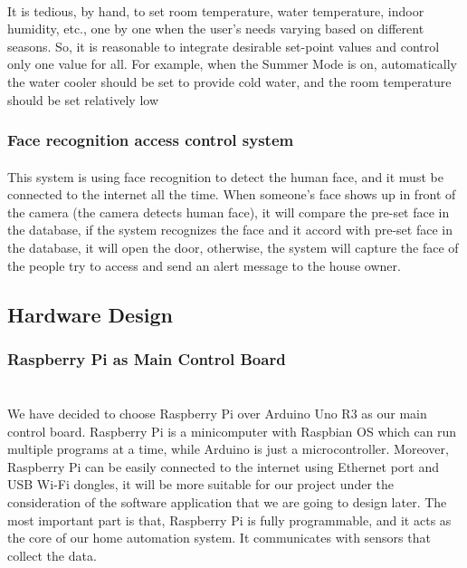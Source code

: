 \documentclass[a4paper,12pt]{article}
\begin{document}
\paragraph{}
It is tedious, by hand, to set room temperature, water temperature, indoor humidity, etc., one by one when the user's needs varying based on different seasons. So, it is reasonable to integrate desirable set-point values and control only one value for all. For example, when the Summer Mode is on, automatically the water cooler should be set to provide cold water, and the room temperature should be set relatively low

\subsubsection{Face recognition access control system}
\paragraph{}
This system is using face recognition to detect the human face, and it must be connected to the internet all the time. When someone’s face shows up in front of the camera (the camera detects human face), it will compare the pre-set face in the database, if the system recognizes the face and it accord with pre-set face in the database, it will open the door, otherwise, the system will capture the face of the people try to access and send an alert message to the house owner.

\subsection{Hardware Design}
\subsubsection{Raspberry Pi as Main Control Board}
\paragraph{}
\\

We have decided to choose Raspberry Pi over Arduino Uno R3 as our main control board. Raspberry Pi is a minicomputer with Raspbian OS which can run multiple programs at a time, while Arduino is just a microcontroller. Moreover, Raspberry Pi can be easily connected to the internet using Ethernet port and USB Wi-Fi dongles, it will be more suitable for our project under the consideration of the software application that we are going to design later. The most important part is that, Raspberry Pi is fully programmable, and it acts as the core of our home automation system. It communicates with sensors that collect the data.
\\\par
\end{document}
